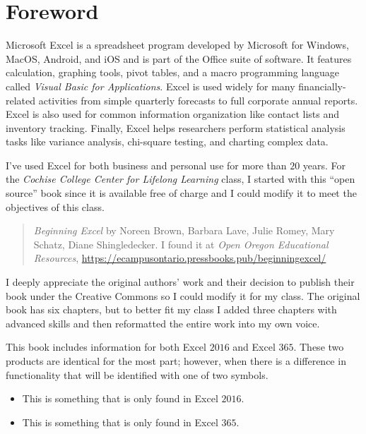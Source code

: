 \chapter*{Foreword}\label{ch:foreword}

Microsoft Excel is a spreadsheet program developed by Microsoft for Windows, MacOS, Android, and iOS and is part of the Office suite of software. It features calculation, graphing tools, pivot tables, and a macro programming language called \textit{Visual Basic for Applications}. Excel is used widely for many financially-related activities from simple quarterly forecasts to full corporate annual reports. Excel is also used for common information organization like contact lists and inventory tracking. Finally, Excel helps researchers perform statistical analysis tasks like variance analysis, chi-square testing, and charting complex data.

I've used Excel for both business and personal use for more than $ 20 $ years. For the \textit{Cochise College Center for Lifelong Learning} class, I started with this ``open source'' book since it is available free of charge and I could modify it to meet the objectives of this class.

\begin{quote}
	\textit{Beginning Excel} by Noreen Brown, Barbara Lave, Julie Romey, Mary Schatz, Diane Shingledecker. I found it at \textit{Open Oregon Educational Resources}, \url{https://ecampusontario.pressbooks.pub/beginningexcel/}
\end{quote}

I deeply appreciate the original authors' work and their decision to publish their book under the Creative Commons so I could modify it for my class. The original book has six chapters, but to better fit my class I added three chapters with advanced skills and then reformatted the entire work into my own voice.

This book includes information for both Excel $ 2016 $ and Excel $ 365 $. These two products are identical for the most part; however, when there is a difference in functionality that will be identified with one of two symbols. 

\begin{itemize}
	\item {} This is something that is only found in Excel $ 2016 $. 
	\item {} This is something that is only found in Excel $ 365 $.
\end{itemize}

